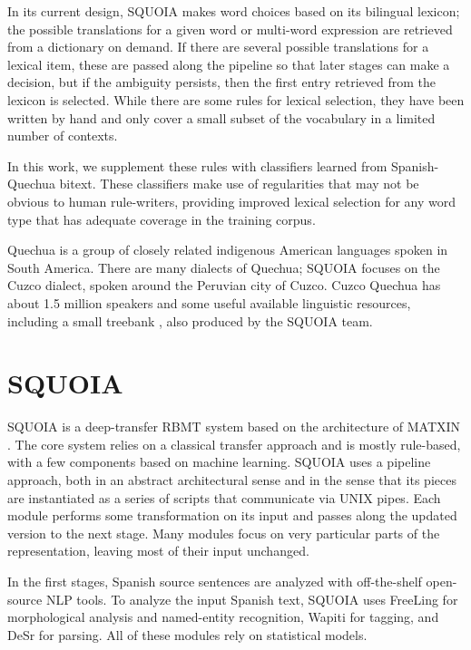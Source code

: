 In its current design, SQUOIA makes word choices based on its bilingual
lexicon; the possible translations for a given word or multi-word expression
are retrieved from a dictionary on demand. If there are several possible
translations for a lexical item, these are passed along the pipeline so
that later stages can make a decision, but if the ambiguity persists,
then the first entry retrieved from the lexicon is selected. While there are
some rules for lexical selection, they have been written by hand and only cover
a small subset of the vocabulary in a limited number of contexts.

In this work, we supplement these rules with classifiers learned from
Spanish-Quechua bitext. These classifiers make use of regularities that may not
be obvious to human rule-writers, providing improved lexical selection for
any word type that has adequate coverage in the training corpus.

Quechua is a group of closely related indigenous American languages spoken in
South America. There are many dialects of Quechua; SQUOIA focuses on the
Cuzco dialect, spoken around the Peruvian city of Cuzco.  Cuzco Quechua has
about 1.5 million speakers and some useful available linguistic resources,
including a small treebank \cite{rios2009quechua}, also produced by the SQUOIA
team.

\section{SQUOIA}
SQUOIA is a deep-transfer RBMT system based on the
architecture of MATXIN \cite{matxin2005,matxin}.
The core system relies on a classical transfer approach and is mostly
rule-based, with a few components based on machine learning.
SQUOIA uses a pipeline approach, both in an abstract architectural sense and in
the sense that its pieces are instantiated as a series of scripts that communicate
via UNIX pipes. Each module performs some transformation on its input and
passes along the updated version to the next stage. Many modules focus on very
particular parts of the representation, leaving most of their input unchanged.

In the first stages, Spanish source sentences are analyzed with off-the-shelf
open-source NLP tools. To analyze the input Spanish text,
SQUOIA uses FreeLing \cite{padro12} for morphological analysis and named-entity
recognition,
Wapiti \cite{lavergne2010practical} for tagging,
and DeSr \cite{attardi-EtAl:2007:EMNLP-CoNLL2007} for parsing.
All of these modules rely on statistical models.

